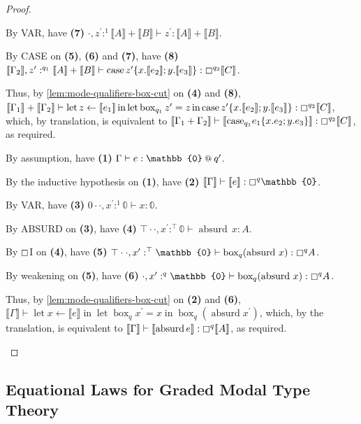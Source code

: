 \documentclass[acmsmall,screen,nonacm]{acmart}
\makeatletter
\DeclareMathOperator{\llet}{\text{let}}
\DeclareMathOperator{\lin}{\text{in}}
\DeclareMathOperator{\bbox}{\text{box}}
\newcommand{\at}{\mathbin{\mbox{\small\ensuremath{@}}}}
\newcommand{\zero}{\mathbb{0}}
\DeclareMathOperator{\absurd}{\text{absurd}}
\newcommand{\tee}{\vdash}
\newcommand{\sem}[1]{\llbracket #1 \rrbracket}
\makeatother
\begin{document}
\begin{proof}
\begin{description}
    By VAR, have \textbf{(7)} $\cdot, z^\prime :^1 \sem{A} + \sem{B} \tee z^\prime : \sem{A} + \sem{B}$.

    By CASE on \textbf{(5)}, \textbf{(6)} and \textbf{(7)}, have \textbf{(8)} $\sem{\Gamma_2}, z^\prime :^{q_1} \sem{A} + \sem{B} \tee \mathrm{case} \, z^\prime \{x.\sem{e_2}; y.\sem{e_3}\} : \boxempty^{q_2} \sem{C}$.
    
    Thus, by \ref{lem:mode-qualifiers-box-cut} on \textbf{(4)} and \textbf{(8)}, $\sem{\Gamma_1} + \sem{\Gamma_2} \tee \llet z \leftarrow \sem{e_1} \lin \llet \bbox_{q_1} z^\prime = z \lin \mathrm{case} \, z^\prime \{x.\sem{e_2}; y.\sem{e_3}\} : \boxempty^{q_2} \sem{C}$, which, by translation, is equivalent to $\sem{\Gamma_1 + \Gamma_2} \tee \sem{\mathrm{case}_{q_1} e_1 \{x.e_2; y.e_3\}} : \boxempty^{q_2} \sem{C}$, as required.
    \\
    \item[Case ABSURD.]
    By assumption, have \textbf{(1)} $\Gamma \tee e : \zero \at q^\prime$.

    By the inductive hypothesis on \textbf{(1)}, have \textbf{(2)} $\sem{\Gamma} \tee \sem{e} : \boxempty^q \zero$.

    By VAR, have \textbf{(3)} $0 \cdot \cdot, x^\prime :^1 \zero \tee x : \zero$.

    By ABSURD on \textbf{(3)}, have \textbf{(4)} $\top \cdot \cdot, x^\prime :^\top \zero \tee \absurd \, x : A$.
    
    By $\boxempty$I on \textbf{(4)}, have \textbf{(5)} $\top \cdot \cdot, x^\prime :^\top \zero \tee \bbox_q(\absurd \, x) : \boxempty^q A$.

    By weakening on \textbf{(5)}, have \textbf{(6)} $\cdot, x^\prime :^q \zero \tee \bbox_q(\absurd \, x) : \boxempty^q A$.

    Thus, by \ref{lem:mode-qualifiers-box-cut} on \textbf{(2)} and \textbf{(6)}, $\sem{\Gamma} \tee \llet x \leftarrow \sem{e} \lin \llet \bbox_q x^\prime = x \lin \bbox_q(\absurd x^\prime)$, which, by the translation, is equivalent to $\sem{\Gamma} \tee \sem{\absurd e} : \boxempty^q \sem{A}$, as required.
    \\
  \end{description}
\end{proof}

\subsection{Equational Laws for Graded Modal Type Theory}
\end{document}
